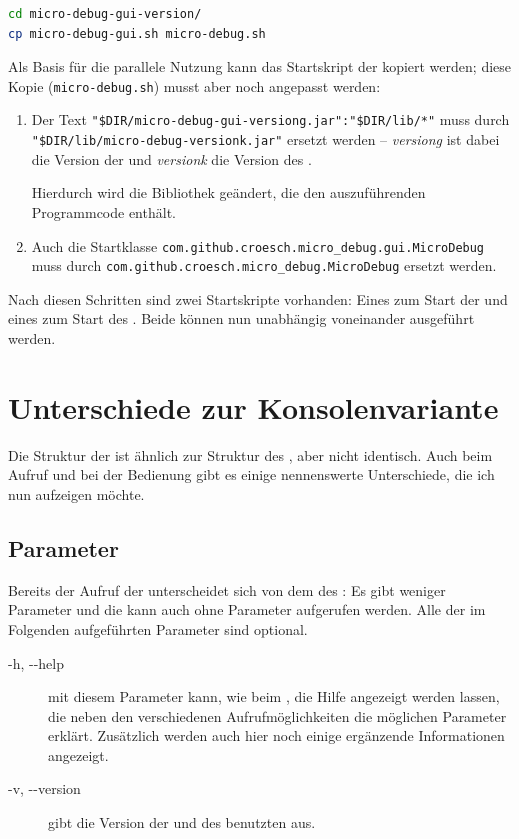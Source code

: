 \begin{lstlisting}[language=sh,caption={Parallele Nutzung des \md und der \mdg},label=\lstlbl{parallele-nutzung-md-mdg}]
cd micro-debug-gui-version/
cp micro-debug-gui.sh micro-debug.sh
\end{lstlisting}

Als Basis für die parallele Nutzung kann das Startskript der \mdg kopiert werden; diese Kopie (\texttt{micro-debug.sh}) musst aber noch angepasst werden:
\begin{enumerate}
\item Der Text \texttt{"\$DIR/micro-debug-gui-versiong.jar":"\$DIR/lib/*"} muss durch \texttt{"\$DIR/lib/micro-debug-versionk.jar"} ersetzt werden -- \emph{versiong} ist dabei die Version der \mdg und \emph{versionk} die Version des \md.

Hierdurch wird die Bibliothek geändert, die den auszuführenden Programmcode enthält.

\item Auch die Startklasse \texttt{com.github.croesch.micro_debug.gui.MicroDebug} muss durch \texttt{com.github.croesch.micro_debug.MicroDebug} ersetzt werden.
\end{enumerate}

Nach diesen Schritten sind zwei Startskripte vorhanden: Eines zum Start der \mdg und eines zum Start des \md. Beide können nun unabhängig voneinander ausgeführt werden.

\section{Unterschiede zur Konsolenvariante}
Die Struktur der \mdg ist ähnlich zur Struktur des \md, aber nicht identisch. Auch beim Aufruf und bei der Bedienung gibt es einige nennenswerte Unterschiede, die ich nun aufzeigen möchte.

\subsection{Parameter}
Bereits der Aufruf der \mdg unterscheidet sich von dem des \md: Es gibt weniger Parameter und die \mdg kann auch ohne Parameter aufgerufen werden. Alle der im Folgenden aufgeführten Parameter sind optional.

\begin{description}
\item[-h, -{}-help]
  mit diesem Parameter kann, wie beim \md, die Hilfe angezeigt werden lassen, die neben den verschiedenen Aufrufmöglichkeiten die möglichen Parameter erklärt. Zusätzlich werden auch hier noch einige ergänzende Informationen angezeigt.

\item[-v, -{}-version]
  gibt die Version der \mdg und des benutzten \md aus.
\end{description}

